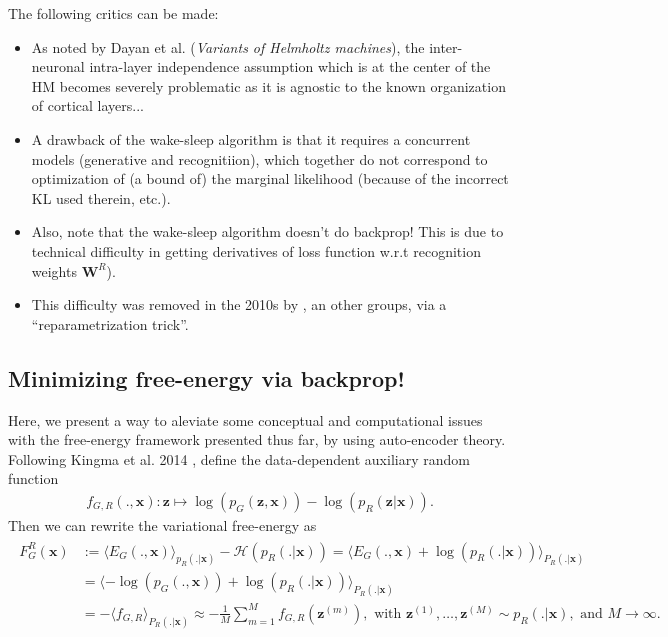 \documentclass[10pt,letterpaper]{article}
\def\z{\mathbf{z}}
\def\W{\mathbf{W}}
\def\x{\mathbf{x}}
\begin{document}
The following critics can be made:
\begin{itemize}
  \item
    As noted by Dayan et al. (\textit{Variants of Helmholtz machines}), the inter-neuronal intra-layer independence assumption which is at the center of the HM becomes severely problematic as it is agnostic to the known organization of cortical layers...
  \item A drawback of the wake-sleep algorithm is that it requires a concurrent models (generative and recognitiion), which together do not correspond to optimization of (a bound of) the marginal likelihood (because of the incorrect KL used therein, etc.).
  \item Also, note that the wake-sleep algorithm doesn't do backprop! This is due to
    technical difficulty in getting derivatives of loss function w.r.t
    recognition weights $\W^R$).
  \item This difficulty was removed in the 2010s by \citep{kingma2013auto}, an other groups, via a ``reparametrization trick''.
    \end{itemize}


\subsection{Minimizing free-energy via backprop!}

\label{sec:vae}
Here, we present a way to aleviate some conceptual and computational issues with the
free-energy framework presented thus far, by using auto-encoder theory.
Following Kingma et al. 2014 \citep{kingma2013auto}, define the data-dependent auxiliary random
function
\begin{eqnarray}
  f_{G,R}(., \x) :\z \mapsto \log(p_G(\z,\x)) - \log(p_R(\z|\x)).
\end{eqnarray}
Then we can rewrite the
variational free-energy as
\begin{eqnarray*}
  \begin{split}
    F_G^R(\x) &:= \langle E_G(., \x) \rangle_{p_R(. |\x)} - \mathcal H(p_R(. |\x)) = \langle E_G(., \x) + \log(p_R(.|\x))\rangle_{P_R(.|\x)}\\
    &=\langle -\log(p_G(.,\x)) + \log(p_R(.|\x))\rangle_{P_R(.|\x)}\\
    &= -\langle f_{G,R}\rangle_{P_R(.|\x)} \approx -\frac{1}{M}\sum_{m=1}^Mf_{G,R}(\z^{(m)}), \text{ with }\z^{(1)},\ldots,\z^{(M)} \sim p_R(.|\x), \text{ and }M \rightarrow \infty.
    \end{split}
\end{eqnarray*}
\end{document}
